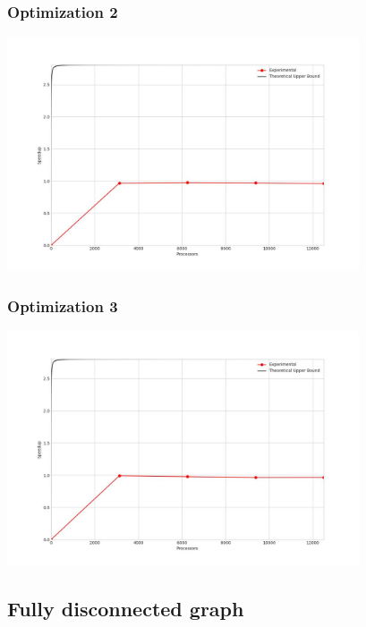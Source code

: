 \subsubsection{Optimization 2}
\begin{center}
    \resizebox{0.8\textwidth}{!}{}
    \includegraphics[width=0.78\textwidth]{../img/speedup-graph_type-fully-connected-12500-O2}
\end{center}

\subsubsection{Optimization 3}
\begin{center}
    \resizebox{0.8\textwidth}{!}{}
    \includegraphics[width=0.78\textwidth]{../img/speedup-graph_type-fully-connected-12500-O3}
\end{center}

\clearpage
\subsection{Fully disconnected graph}
